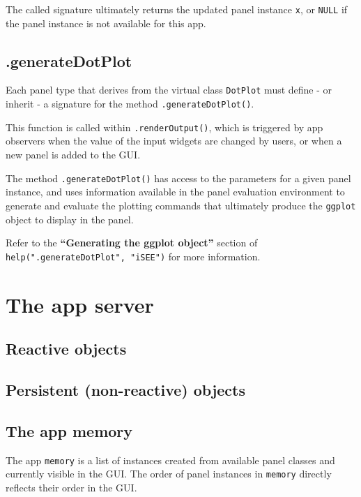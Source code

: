 \documentclass[]{book}
\begin{document}
The called signature ultimately returns the updated panel instance
\texttt{x}, or \texttt{NULL} if the panel instance is not available for
this app.

\section{.generateDotPlot}\label{generatedotplot}

Each panel type that derives from the virtual class \texttt{DotPlot}
must define - or inherit - a signature for the method
\texttt{.generateDotPlot()}.

This function is called within \texttt{.renderOutput()}, which is
triggered by app observers when the value of the input widgets are
changed by users, or when a new panel is added to the GUI.

The method \texttt{.generateDotPlot()} has access to the parameters for
a given panel instance, and uses information available in the panel
evaluation environment to generate and evaluate the plotting commands
that ultimately produce the \texttt{ggplot} object to display in the
panel.

Refer to the \textbf{``Generating the ggplot object''} section of
\texttt{help(".generateDotPlot",\ "iSEE")} for more information.

\chapter{The app server}\label{server}

\hypertarget{robjects}{\section{Reactive objects}\label{robjects}}

\section{Persistent (non-reactive)
objects}\label{persistent-non-reactive-objects}

\hypertarget{memory}{\section{The app memory}\label{memory}}

The app \texttt{memory} is a list of instances created from available
panel classes and currently visible in the GUI. The order of panel
instances in \texttt{memory} directly reflects their order in the GUI.
\end{document}
